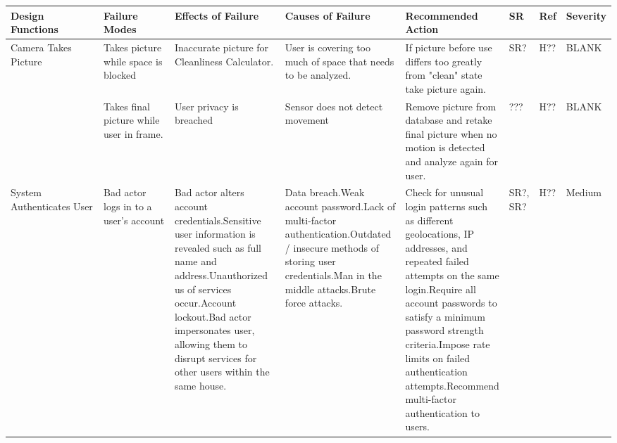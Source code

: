 \documentclass{article}
\begin{document}
\begin{table}[H]
\begin{adjustbox}{width=\textwidth}
\begin{tabular}{|p{0.27\linewidth} | p{0.25\linewidth} | p{0.22\linewidth}|  p{0.22\linewidth}|  p{0.30\linewidth}|  p{0.07\linewidth}|  p{0.07\linewidth}|p{0.12\linewidth}| }
    \hline
         \textbf{Design Functions} & \textbf{Failure Modes} & \textbf{Effects of Failure} & \textbf{Causes of Failure} & \textbf{Recommended Action} & \textbf{SR} & \textbf{Ref} & \textbf{Severity}\\
         \hline
         Camera Takes Picture & Takes picture while space is blocked\newline & Inaccurate picture for Cleanliness Calculator.\newline & User is covering too much of space that needs to be analyzed.\newline & If picture before use differs too greatly from "clean" state take picture again. & SR? & H?? & BLANK\\
          & Takes final picture while user in frame. & User privacy is breached & Sensor does not detect movement& Remove picture from database and retake final picture when no motion is detected and analyze again for user.  & ??? & H?? & BLANK\\
         \hline
         System Authenticates User & Bad actor logs in to a user's account& Bad actor alters account credentials.\newline\newline Sensitive user information is revealed such as full name and address.\newline\newline Unauthorized us of services occur.\newline\newline Account lockout.\newline\newline Bad actor impersonates user, allowing them to disrupt services for other users within the same house. & Data breach.\newline\newline Weak account password.\newline\newline Lack of multi-factor authentication.\newline\newline Outdated / insecure methods of storing user credentials.\newline\newline Man in the middle attacks.\newline\newline Brute force attacks. & Check for unusual login patterns such as different geolocations, IP addresses, and repeated failed attempts on the same login.\newline\newline Require all account passwords to satisfy a minimum password strength criteria.\newline\newline Impose rate limits on failed authentication attempts.\newline\newline Recommend multi-factor authentication to users. & SR?, SR? & H?? & Medium\\

\end{tabular}
\end{adjustbox}
\end{table}
\end{document}
